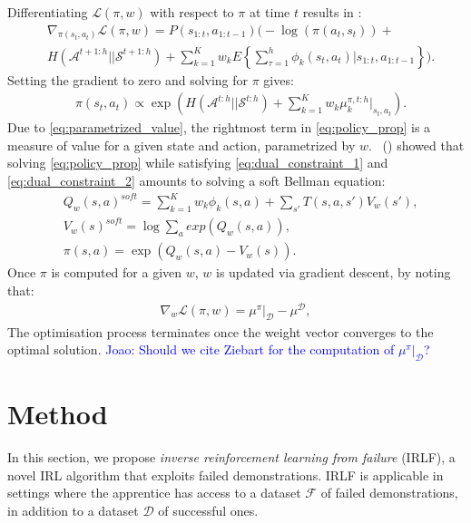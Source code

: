 \documentclass[letterpaper]{article}
\newcommand{\citet}[1]{\citeauthor{#1}~(\citeyear{#1})}
\newcommand{\jm}[1]{\textcolor{blue}{Joao: #1}}
\newcommand{\jm}[1]{}
\begin{document}
Differentiating $\mathcal{L}(\pi,w)$ with respect to $\pi$ at time $t$ results in \cite[p.\ 186]{ziebart2010modelingthesis}:
\begin{equation}
 \begin{split}
 &\nabla_{\pi(s_t,a_t)}\mathcal{L}(\pi,w) = P(s_{1:t},a_{1:t-1})\Bigg(-\log(\pi(a_t,s_t))+ \\
& H(\mathcal{A}^{t+1:h}||\mathcal{S}^{t+1:h})
 +\sum_{k=1}^K w_kE\left\{\sum_{\tau=1}^h \phi_k(s_t,a_t)|s_{1:t},a_{1:t-1}\right\}\Bigg). \label{eqn:zieb_lagragian_derivative}
 \end{split}
\end{equation}
Setting the gradient to zero and solving for $\pi$ gives:
\begin{equation}
\label{eq:policy_prop}
	\begin{split}
	&\pi(s_t,a_t) \propto \exp\left(H(\mathcal{A}^{t:h}||\mathcal{S}^{t:h})+\sum^K_{k=1} w_k\mu_k^{\pi,t:h}|_{s_t,a_t}\right).
	\end{split}
\end{equation}
Due to \eqref{eq:parametrized_value}, the rightmost term in \eqref{eq:policy_prop} is a measure of value for a given state and action, parametrized by $w$. \citet{ziebart2010modelingthesis} showed that solving \eqref{eq:policy_prop} while satisfying \eqref{eq:dual_constraint_1} and \eqref{eq:dual_constraint_2} amounts to solving a soft Bellman equation:
	\begin{equation}
		\begin{split}
	&Q_w(s,a)^{soft} = \sum_{k=1}^Kw_k\phi_k(s,a) + \sum_{s'}T(s,a,s')V_w(s'),\\	
	&V_w(s)^{soft} = \log\sum_{a}exp(Q_w(s,a)),\\
	&\pi(s,a) = \exp(Q_w(s,a) - V_w(s)).
	\end{split}
	\label{eq:soft_backup}
	\end{equation}
Once $\pi$ is computed for a given $w$, $w$ is updated via gradient descent, by noting that:
 \begin{align}
   \label{eq:weight_update}
   \nabla_{w}\mathcal{L}(\pi,w) =\mu^\pi|_{\mathcal{D}} - \mu^{\mathcal{D}},
 \end{align}
The optimisation process terminates once the weight vector converges to the optimal solution. \jm{Should we cite Ziebart for the computation of $\mu^\pi|_{\mathcal{D}}$?}

\section{Method}
In this section, we propose \emph{inverse reinforcement learning from failure} (IRLF), a novel IRL algorithm that exploits failed demonstrations.  IRLF is applicable in settings where the apprentice has access to a dataset $\mathcal{F}$ of failed demonstrations, in addition to a dataset $\mathcal{D}$ of successful ones.
\end{document}
